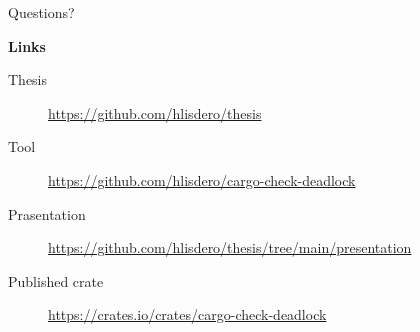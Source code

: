 \documentclass{beamer}
\begin{document}
\begin{frame}{}
  \huge
  \centering
  Questions?


  \vfill
  \raggedright
  \normalsize
  \textbf{Links}
  
  \scriptsize

  \begin{description}
    \item [Thesis] \url{https://github.com/hlisdero/thesis}
    \item [Tool] \url{https://github.com/hlisdero/cargo-check-deadlock}
    \item [Prasentation] \url{https://github.com/hlisdero/thesis/tree/main/presentation}
    \item [Published crate] \url{https://crates.io/crates/cargo-check-deadlock}
  \end{description}
\end{frame}
\end{document}

